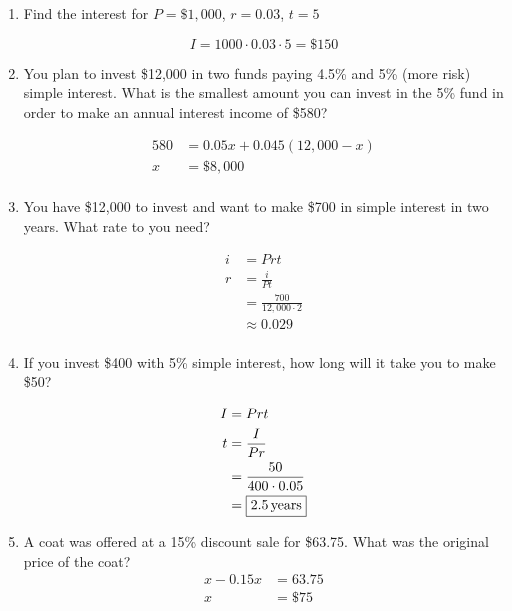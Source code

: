 \documentclass[letterpaper, landscape]{exam}
\begin{document}
  \begin{enumerate}
    \item Find the interest for $P = \$1,000$, $r = 0.03$, $t = 5$

      \[
        I = 1000 \cdot 0.03 \cdot 5 = \boxed{ \$150 }
      \]
    \item You plan to invest \$12,000 in two funds paying 4.5\% and 5\% (more risk) simple interest.
      What is the smallest amount you can invest in the 5\% fund in order to make an annual interest
      income of \$580?

      \begin{align*}
        580 & = 0.05 x + 0.045 (12,000 - x) \\
        x   & = \boxed{ \$8,000 } \\
      \end{align*}

    \item You have \$12,000 to invest and want to make \$700 in simple interest in two years. What
      rate to you need?

      \begin{align*}
        i & = Prt \\
        r & = \frac{i}{Pt} \\
          & = \frac{700}{12,000 \cdot 2} \\
          & \approx \boxed{ 0.029 } \\
      \end{align*}

    \item If you invest \$400 with 5\% simple interest, how long will it take you to make \$50?
      
      \begin{align*}
        I & = Prt \\
        t & = \frac{I}{P r} \\
          & = \frac{50}{400 \cdot 0.05} \\
          & = \boxed{ \unit[2.5]{years} } \\
      \end{align*}

    \item A coat was offered at a 15\% discount sale for \$63.75.  What was the original price of the coat?
      \begin{align*}
        x - 0.15x & = 63.75 \\
        x         & = \boxed{ \$75 } \\
      \end{align*}

  \end{enumerate}
  
\end{document}

